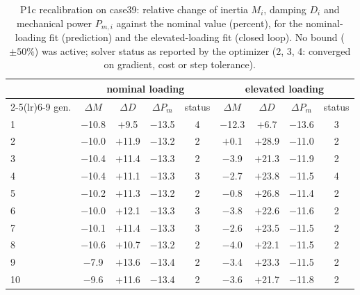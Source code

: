 \begin{table}[H]\centering\small
\caption{P1c recalibration on case39: relative change of inertia $M_i$, damping $D_i$ and mechanical power $P_{m,i}$ against the nominal value (percent), for the nominal-loading fit (prediction) and the elevated-loading fit (closed loop). No bound ($\pm50\%$) was active; solver status as reported by the optimizer (2, 3, 4: converged on gradient, cost or step tolerance).}
\label{tab:S:p1c_case39}
\begin{tabular}{lcccccccc}
\toprule
 & \multicolumn{4}{c}{nominal loading} & \multicolumn{4}{c}{elevated loading}\\
\cmidrule(lr){2-5}\cmidrule(lr){6-9}
gen. & $\Delta M$ & $\Delta D$ & $\Delta P_m$ & status & $\Delta M$ & $\Delta D$ & $\Delta P_m$ & status\\
\midrule
1 & $-$10.8 & $+$9.5 & $-$13.5 & 4 & $-$12.3 & $+$6.7 & $-$13.6 & 3\\
2 & $-$10.0 & $+$11.9 & $-$13.2 & 2 & $+$0.1 & $+$28.9 & $-$11.0 & 2\\
3 & $-$10.4 & $+$11.4 & $-$13.3 & 2 & $-$3.9 & $+$21.3 & $-$11.9 & 2\\
4 & $-$10.4 & $+$11.1 & $-$13.3 & 3 & $-$2.7 & $+$23.8 & $-$11.5 & 4\\
5 & $-$10.2 & $+$11.3 & $-$13.2 & 2 & $-$0.8 & $+$26.8 & $-$11.4 & 2\\
6 & $-$10.0 & $+$12.1 & $-$13.3 & 3 & $-$3.8 & $+$22.6 & $-$11.6 & 2\\
7 & $-$10.1 & $+$11.4 & $-$13.3 & 3 & $-$2.6 & $+$23.5 & $-$11.5 & 2\\
8 & $-$10.6 & $+$10.7 & $-$13.2 & 2 & $-$4.0 & $+$22.1 & $-$11.5 & 2\\
9 & $-$7.9 & $+$13.6 & $-$13.4 & 2 & $-$3.4 & $+$23.3 & $-$11.5 & 2\\
10 & $-$9.6 & $+$11.6 & $-$13.4 & 2 & $-$3.6 & $+$21.7 & $-$11.8 & 2\\
\bottomrule
\end{tabular}
\end{table}

